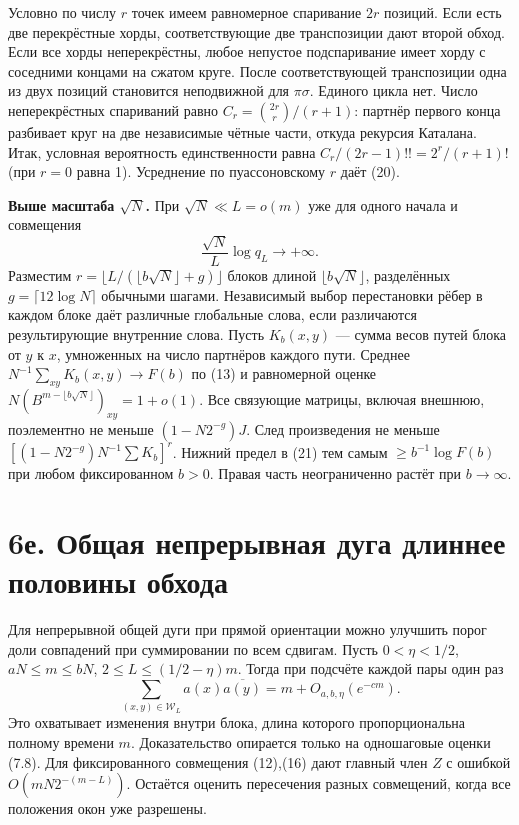 \documentclass[11pt,a4paper]{article}
\newcommand{\sect}[1]{\section*{\sffamily\color{ink}#1}}
\newcommand{\subt}[1]{\par\medskip\noindent\textbf{#1.}\quad}
\begin{document}
Условно по числу $r$ точек имеем равномерное спаривание $2r$ позиций. Если есть две перекрёстные хорды, соответствующие две транспозиции дают второй обход. Если все хорды неперекрёстны, любое непустое подспаривание имеет хорду с соседними концами на сжатом круге. После соответствующей транспозиции одна из двух позиций становится неподвижной для $\pi\sigma$. Единого цикла нет. Число неперекрёстных спариваний равно $C_r=\binom{2r}r/(r+1)$: партнёр первого конца разбивает круг на две независимые чётные части, откуда рекурсия Каталана. Итак, условная вероятность единственности равна $C_r/(2r-1)!!=2^r/(r+1)!$ (при $r=0$ равна 1). Усреднение по пуассоновскому $r$ даёт (20).

\subt{Выше масштаба $\sqrt N$} При $\sqrt N\ll L=o(m)$ уже для одного начала и совмещения
\[
                          \frac{\sqrt N}{L}\log q_L\to+\infty.              \tag{21}
\]
Разместим $r=\lfloor L/(\lfloor b\sqrt N\rfloor+g)\rfloor$ блоков длиной $\lfloor b\sqrt N\rfloor$, разделённых $g=\lceil12\log N\rceil$ обычными шагами. Независимый выбор перестановки рёбер в каждом блоке даёт различные глобальные слова, если различаются результирующие внутренние слова. Пусть $K_b(x,y)$ --- сумма весов путей блока от $y$ к $x$, умноженных на число партнёров каждого пути. Среднее $N^{-1}\sum_{xy}K_b(x,y)\to F(b)$ по (13) и равномерной оценке $N(B^{m-\lfloor b\sqrt N\rfloor})_{xy}=1+o(1)$. Все связующие матрицы, включая внешнюю, поэлементно не меньше $(1-N2^{-g})J$. След произведения не меньше $[(1-N2^{-g})N^{-1}\sum K_b]^r$. Нижний предел в (21) тем самым $\ge b^{-1}\log F(b)$ при любом фиксированном $b>0$. Правая часть неограниченно растёт при $b\to\infty$.
\newpage
\sect{6е. Общая непрерывная дуга длиннее половины обхода}
Для непрерывной общей дуги при прямой ориентации можно улучшить порог доли совпадений при суммировании по всем сдвигам. Пусть $0<\eta<1/2$, $aN\le m\le bN$, $2\le L\le (1/2-\eta)m$. Тогда при подсчёте каждой пары один раз
\[
                     \sum_{(x,y)\in\mathcal W_L} a(x)\overline{a(y)}
                                  =m+O_{a,b,\eta}(e^{-c m}).                \tag{22}
\]
Это охватывает изменения внутри блока, длина которого пропорциональна полному времени $m$. Доказательство опирается только на одношаговые оценки (7.8). Для фиксированного совмещения (12),(16) дают главный член $Z$ с ошибкой $O(mN2^{-(m-L)})$. Остаётся оценить пересечения разных совмещений, когда все положения окон уже разрешены.
\end{document}
